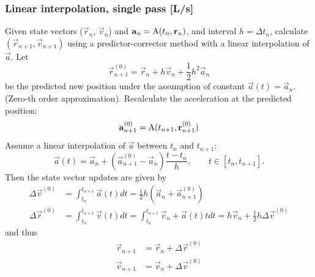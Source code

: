 \documentclass[Orbiter Technical Reference.tex]{subfiles}
\begin{document}
\subsubsection{Linear interpolation, single pass [L/s]}
Given state vectors ($\vec{r}_n$, $\vec{v}_n$) and $\mathbf{a}_n = \mathrm{A}(t_n,\mathbf{r}_n)$, and interval $h=\Delta t_n$, calculate $(\vec{r}_{n+1},\vec{v}_{n+1})$ using a predictor-corrector method with a linear interpolation of $\vec{a}$.
Let
\begin{equation*}
\vec{r}_{n+1}^{(0)} = \vec{r}_n + h\vec{v}_n + \frac{1}{2} h^2\vec{a}_n
\end{equation*}
be the predicted new position under the assumption of constant $\vec{a}(t) = \vec{a}_n$. (Zero-th order approximation).
Recalculate the acceleration at the predicted position:
\begin{equation*}
\mathbf{a}_{n+1}^{(0)} = \mathrm{A}(t_{n+1},\mathbf{r}_{n+1}^{(0)})
\end{equation*}
Assume a linear interpolation of $\vec{a}$ between $t_n$ and $t_{n+1}$:
\begin{equation*}
\vec{a}(t) = \vec{a}_n + (\vec{a}_{n+1}^{(0)}-\vec{a}_n)\frac{t-t_n}{h},
\qquad t \in [t_n, t_{n+1}].
\end{equation*}
Then the state vector updates are given by
\begin{equation}
\begin{split}
\Delta\vec{v}^{(0)} &= \int_{t_n}^{t_{n+1}} \vec{a}(t) dt = \frac{1}{2}h (\vec{a}_n+\vec{a}_{n+1}^{(0)}) \\
\Delta\vec{r}^{(0)} &= \int_{t_n}^{t_{n+1}} \vec{v}(t) dt = \int_{t_n}^{t_{n+1}} \vec{v}_n + \vec{a}(t)t dt = h\vec{v}_n + \frac{1}{2}h\Delta\vec{v}^{(0)} \label{eq:lin_pos_upd}
\end{split}
\end{equation}
and thus
\begin{equation*}
\begin{split}
\vec{r}_{n+1} &= \vec{r}_n + \Delta\vec{r}^{(0)} \\
\vec{v}_{n+1} &= \vec{v}_n + \Delta\vec{v}^{(0)}
\end{split}
\end{equation*}
\end{document}
